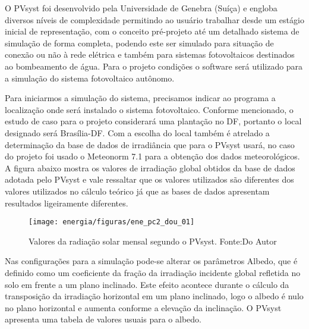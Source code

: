 O PVsyst foi desenvolvido pela Universidade de Genebra (Suíça) e engloba diversos níveis de complexidade permitindo ao usuário trabalhar desde um estágio inicial de representação, com o conceito pré-projeto até um detalhado sistema de simulação de forma completa, podendo este ser simulado para situação de conexão ou não à rede elétrica e também para sistemas fotovoltaicos destinados ao bombeamento de água. Para o projeto condições o software será utilizado para a simulação do sistema fotovoltaico autônomo. \cite{melo}

Para iniciarmos a simulação do sistema, precisamos indicar ao programa a localização onde será instalado o sistema fotovoltaico. Conforme mencionado, o estudo de caso para o projeto considerará uma plantação no DF, portanto o local designado será Brasília-DF. Com a escolha do local também é atrelado a determinação da base de dados de irradiância que para o PVsyst usará, no caso do projeto foi usado o Meteonorm 7.1 para a obtenção dos dados meteorológicos. A figura abaixo mostra os valores de irradiação global obtidos da base de dados adotada pelo PVsyst e vale ressaltar que os valores utilizados são diferentes dos valores utilizados no cálculo teórico já que as bases de dados apresentam resultados ligeiramente diferentes.  

\begin{figure}[H]
		\centering
		\texttt{[image: energia/figuras/ene\_pc2\_dou\_01]}
		\caption{Valores da radiação solar mensal segundo o PVsyst. Fonte:Do Autor}
		\label{ene_pc2_dou_01}
\end{figure}

Nas configurações para a simulação pode-se alterar os parâmetros Albedo, que é definido como um coeficiente da fração da irradiação incidente global refletida no solo em frente a um plano inclinado. Este efeito acontece durante o cálculo da transposição da irradiação horizontal em um plano inclinado, logo o albedo é nulo no plano horizontal e aumenta conforme a elevação da inclinação. O PVsyst apresenta uma tabela de valores usuais para o albedo.

